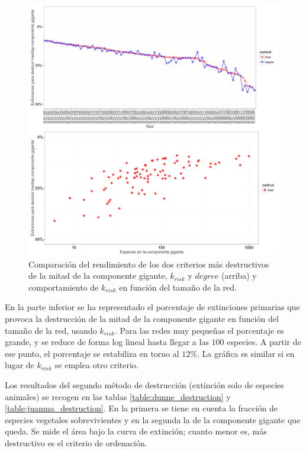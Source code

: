\clearpage
\begin{figure}[h!]
\centering
\includegraphics[scale=0.55]{Figures/DEST_krisk_kdegree_comparison_ES.png}
\caption {Comparación del rendimiento de los dos criterios más destructivos de la mitad de la componente gigante, $k_{risk}$ y $degree$ (arriba) y comportamiento de ${k}_{risk}$ en función del tamaño de la red.}
\label{fig:DEST_krisk_kdegree_comparison_ES}
\end{figure}

En la parte inferior se ha representado el porcentaje de extinciones primarias que provoca la destrucción de la mitad de la componente gigante en función del tamaño de la red, usando ${k}_{risk}$. Para las redes muy pequeñas el porcentaje es grande, y se reduce de forma log lineal hasta llegar a las $100$ especies. A partir de ese punto, el porcentaje se estabiliza en torno al $12\%$. La gráfica es similar si en lugar de ${k}_{risk}$ se emplea otro criterio.

Los resultados del segundo método de destrucción (extinción solo de especies animales) se recogen en las tablas \ref{table:dunne_destruction} y \ref{table:juanma_destruction}. En la primera se tiene en cuenta la fracción de especies vegetales sobrevivientes y en la segunda la de la componente gigante que queda. Se mide el área bajo la curva de extinción; cuanto menor es, más destructivo es el criterio de ordenación.

